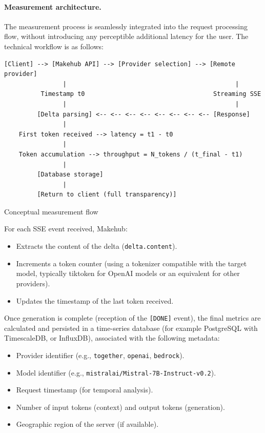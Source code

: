 \documentclass[english]{article}
\begin{document}
\paragraph{Measurement architecture.}

The measurement process is seamlessly integrated into the request processing flow, without introducing any perceptible additional latency for the user. The technical workflow is as follows:

\begin{listing}[H]
\begin{verbatim}
[Client] --> [Makehub API] --> [Provider selection] --> [Remote provider]
                |                                              |
          Timestamp t0                                   Streaming SSE
                |                                              |
         [Delta parsing] <-- <-- <-- <-- <-- <-- <-- <-- [Response]
                |
    First token received --> latency = t1 - t0
                |
    Token accumulation --> throughput = N_tokens / (t_final - t1)
                |
         [Database storage]
                |
         [Return to client (full transparency)]
\end{verbatim}
\caption{Conceptual measurement flow}
\end{listing}

For each SSE event received, Makehub:
\begin{itemize}
    \item Extracts the content of the delta (\texttt{delta.content}).
    \item Increments a token counter (using a tokenizer compatible with the target model, typically tiktoken for OpenAI models or an equivalent for other providers).
    \item Updates the timestamp of the last token received.
\end{itemize}

Once generation is complete (reception of the \texttt{[DONE]} event), the final metrics are calculated and persisted in a time-series database (for example PostgreSQL with TimescaleDB, or InfluxDB), associated with the following metadata:
\begin{itemize}
    \item Provider identifier (e.g., \texttt{together}, \texttt{openai}, \texttt{bedrock}).
    \item Model identifier (e.g., \texttt{mistralai/Mistral-7B-Instruct-v0.2}).
    \item Request timestamp (for temporal analysis).
    \item Number of input tokens (context) and output tokens (generation).
    \item Geographic region of the server (if available).
\end{itemize}
\end{document}
